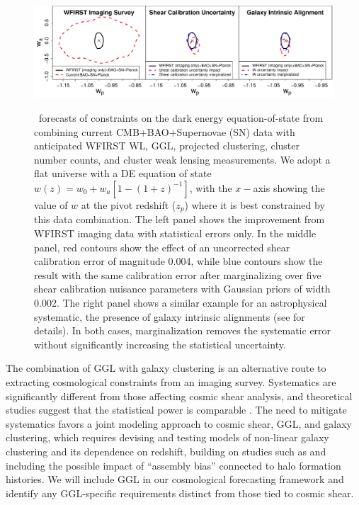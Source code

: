 \begin{figure}[!t]
 \begin{boxedminipage}{1.0\textwidth}
 \begin{center}
\includegraphics[width = \textwidth]{Plots/WFIRST_combi_forecasts.pdf}
\label{fig:WLsys}
 \end{center}
\vspace{-1.25cm}
\caption{\footnotesize{\CoLi\ forecasts of constraints on the dark energy equation-of-state
from combining current CMB+BAO+Supernovae (SN) data with anticipated WFIRST WL, GGL, projected clustering, cluster number counts, and cluster weak lensing measurements.
We adopt a flat universe with a DE equation of state
$w(z)=w_0+w_a[1-(1+z)^{-1}]$, with the $x-$axis showing the
value of $w$ at the pivot redshift ($z_p$) where it is best constrained by this data combination.
The left panel shows the improvement from WFIRST imaging data with statistical errors only.
In the middle panel, red contours show the effect of an uncorrected shear calibration error
of magnitude 0.004, while blue contours show the result with the same calibration error
after marginalizing over five shear calibration nuisance parameters with Gaussian priors of
width 0.002. The right panel shows a similar example for an astrophysical systematic,
the presence of galaxy intrinsic alignments (see \cite{Krause2015} for details). In both cases, marginalization removes the systematic error without significantly increasing the statistical uncertainty.
}}
\end{boxedminipage}
\end{figure}

 The combination of GGL with galaxy clustering
is an alternative route to extracting cosmological constraints from
an imaging survey.  Systematics are significantly different from those
affecting cosmic shear analysis, and theoretical studies suggest that
the statistical power is comparable \cite{Yoo2012}.  The need to mitigate systematics
favors a joint modeling approach to cosmic shear, GGL, and galaxy clustering,
which requires devising and testing models of non-linear galaxy
clustering and its dependence on redshift, building on studies such as
\cite{Yoo2006,Baldauf2010,Cacciato2013,Mandelbaum2013,Coupon15,More2015,Zu2015} and
including the possible impact of ``assembly bias'' connected to halo
formation histories.
We will include GGL in our cosmological forecasting framework
and identify any GGL-specific requirements distinct from those
tied to cosmic shear.

